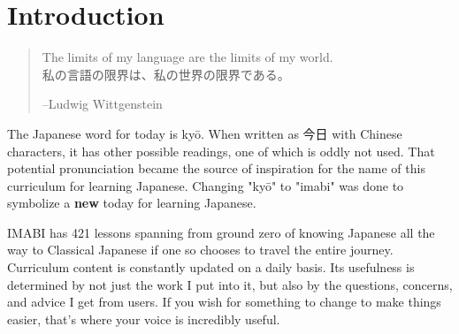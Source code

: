 \chapter*{Introduction} %

\begin{quote}
\begin{center}
The limits of my language are the limits of my world.\\
私の言語の限界は、私の世界の限界である。
\end{center}
\begin{flushright}
--Ludwig Wittgenstein
\end{flushright}
\end{quote}

\begin{comment}
\begin{quote}
\begin{center}
To have another language is to possess a second soul.\\
別の言語を話すことができるということは、第二の魂を持っているということ。
\end{center}
\begin{flushright}
--Charlemagne
\end{flushright}
\end{quote}
\end{comment}

\par{ }
\par{ The Japanese word for today is kyō. When written as 今日 with Chinese characters, it has other possible readings, one of which is oddly not used. That potential pronunciation became the source of inspiration for the name of this curriculum for learning Japanese. Changing "kyō" to "imabi" was done to symbolize a \textbf{new} today for learning Japanese.
}
\par{ IMABI has 421 lessons spanning from ground zero of knowing Japanese all the way to Classical Japanese if one so chooses to travel the entire journey. Curriculum content is constantly updated on a daily basis. Its usefulness is determined by not just the work I put into it, but also by the questions, concerns, and advice I get from users. If you wish for something to change to make things easier, that's where your voice is incredibly useful.
}